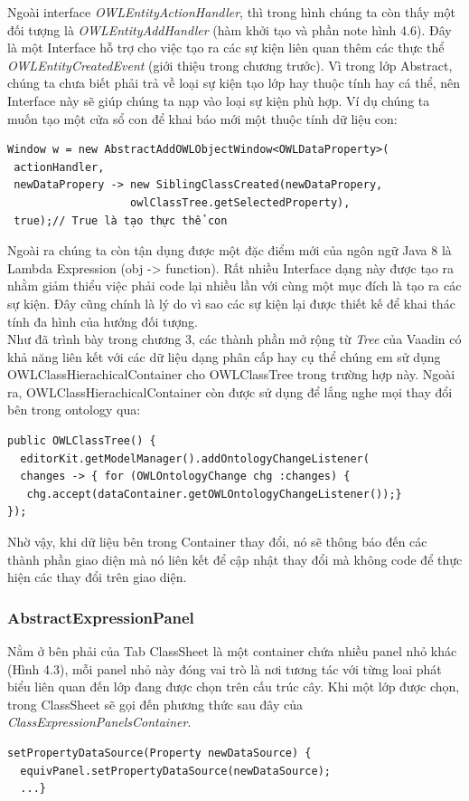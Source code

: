 Ngoài interface \textit{OWLEntityActionHandler}, thì trong hình chúng ta còn thấy một đối tượng là \textit{OWLEntityAddHandler} (hàm khởi tạo và phần note hình 4.6). Đây là một Interface hỗ trợ cho việc tạo ra các sự kiện liên quan thêm các thực thể \textit{OWLEntityCreatedEvent} (giới thiệu trong chương trước). Vì trong lớp Abstract, chúng ta chưa biết phải trả về loại sự kiện tạo lớp hay thuộc tính hay cá thể, nên Interface này sẽ giúp chúng ta nạp vào loại sự kiện phù hợp. Ví dụ chúng ta muốn tạo một cửa sổ con để khai báo mới một thuộc tính dữ liệu con:
\begin{verbatim}
Window w = new AbstractAddOWLObjectWindow<OWLDataProperty>(
 actionHandler,
 newDataPropery -> new SiblingClassCreated(newDataPropery, 
                   owlClassTree.getSelectedProperty),
 true);// True là tạo thực thể con
\end{verbatim}
Ngoài ra chúng ta còn tận dụng được một đặc điểm mới của ngôn ngữ Java 8 là Lambda Expression (obj -> function). Rất nhiều Interface dạng này được tạo ra nhằm giảm thiểu việc phải code lại nhiều lần với cùng một mục đích là tạo ra các sự kiện. Đây cũng chính là lý do vì sao các sự kiện lại được thiết kế để khai thác tính đa hình của hướng đối tượng.
\\
Như đã trình bày trong chương 3, các thành phần mở rộng từ \textit{Tree} của Vaadin có khả năng liên kết với các dữ liệu dạng phân cấp hay cụ thể chúng em sử dụng OWLClassHierachicalContainer cho OWLClassTree trong trường hợp này. Ngoài ra, OWLClassHierachicalContainer còn được sử dụng để lắng nghe mọi thay đổi bên trong ontology qua:
\begin{verbatim}
public OWLClassTree() {
  editorKit.getModelManager().addOntologyChangeListener(
  changes -> { for (OWLOntologyChange chg :changes) { 
   chg.accept(dataContainer.getOWLOntologyChangeListener());}
});       
\end{verbatim}
Nhờ vậy, khi dữ liệu bên trong Container thay đổi, nó sẽ thông báo đến các thành phần giao diện mà nó liên kết để cập nhật thay đổi mà không code để thực hiện các thay đổi trên giao diện.
\subsubsection{AbstractExpressionPanel}
Nằm ở bên phải của Tab ClassSheet là một container chứa nhiều panel nhỏ khác (Hình 4.3), mỗi panel nhỏ này đóng vai trò là nơi tương tác với từng loai phát biểu liên quan đến lớp đang được chọn trên cấu trúc cây. Khi một lớp được chọn, trong ClassSheet sẽ gọi đến phương thức sau đây của \textit{ClassExpressionPanelsContainer}.
\begin{verbatim}
setPropertyDataSource(Property newDataSource) {
  equivPanel.setPropertyDataSource(newDataSource);
  ...}
\end{verbatim}

